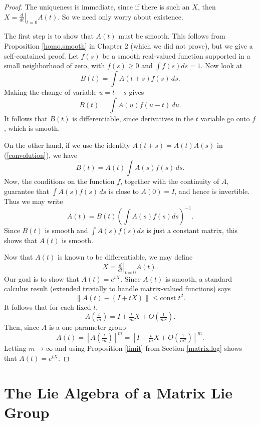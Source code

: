 \documentclass{amsbook}
\theoremstyle{plain}
\numberwithin{equation}{chapter}
\numberwithin{theorem}{chapter}
\begin{document}
\begin{proof}
The uniqueness is immediate, since if there is such an $X$, then $X=\left.
\frac{d}{dt}\right|  _{t=0}A(t)$. So we need only worry about existence.

The first step is to show that $A(t)$ must be smooth. This follows from
Proposition \ref{homo.smooth} in Chapter 2 (which we did not prove), but we
give a self-contained proof. Let $f(s)$ be a smooth real-valued function
supported in a small neighborhood of zero, with $f(s)\geq0$ and $\int
f(s)ds=1$. Now look at
\begin{equation}
B(t)=\int A(t+s)f(s)\,ds\text{.}\label{convolution}%
\end{equation}
Making the change-of-variable $u=t+s$ gives
\[
B(t)=\int A(u)f(u-t)\,du\text{.}%
\]
It follows that $B(t)$ is differentiable, since derivatives in the $t$
variable go onto $f$, which is smooth.

On the other hand, if we use the identity $A(t+s)=A(t)A(s)$ in
(\ref{convolution}), we have
\[
B(t)=A(t)\int A(s)f(s)\,ds\text{.}%
\]
Now, the conditions on the function $f$, together with the continuity of $A$,
guarantee that $\int A(s)f(s)\,ds$ is close to $A(0)=I$, and hence is
invertible. Thus we may write
\begin{equation}
A(t)=B(t)\left(  \int A(s)f(s)ds\right)  ^{-1}\text{.}\label{smooth}%
\end{equation}
Since $B\left(  t\right)  $ is smooth and $\int A(s)f(s)ds$ is just a constant
matrix, this shows that $A\left(  t\right)  $ is smooth.

Now that $A(t)$ is known to be differentiable, we may define
\[
X=\left.  \tfrac{d}{dt}\right|  _{t=0}A(t)\text{.}%
\]
Our goal is to show that $A(t)=e^{tX}$. Since $A(t)$ is smooth, a standard
calculus result (extended trivially to handle matrix-valued functions) says
\[
\left\|  A(t)-(I+tX)\right\|  \leq\mathrm{const.}t^{2}\text{.}%
\]
It follows that for each fixed $t$,
\[
A\left(  \tfrac{t}{m}\right)  =I+\tfrac{t}{m}X+O\left(  \tfrac{1}{m^{2}%
}\right)  \text{.}%
\]
Then, since $A$ is a one-parameter group
\[
A(t)=\left[  A\left(  \tfrac{t}{m}\right)  \right]  ^{m}=\left[  I+\tfrac
{t}{m}X+O\left(  \tfrac{1}{m^{2}}\right)  \right]  ^{m}\text{.}%
\]
Letting $m\rightarrow\infty$ and using Proposition \ref{limit} from Section
\ref{matrix.log} shows that $A(t)=e^{tX}$.
\end{proof}

\section{The Lie Algebra of a Matrix Lie Group\label{lie.algebra}}
\end{document}
